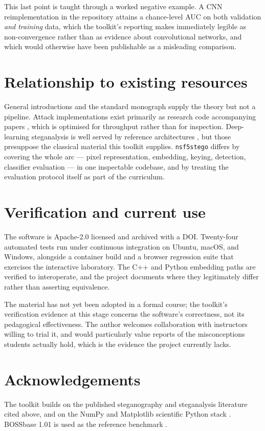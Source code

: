 \documentclass[11pt,a4paper]{article}
\begin{document}
This last point is taught through a worked negative example. A CNN
reimplementation in the repository attains a chance-level AUC on both validation
\emph{and training} data, which the toolkit's reporting makes immediately legible
as non-convergence rather than as evidence about convolutional networks, and
which would otherwise have been publishable as a misleading comparison.

\section*{Relationship to existing resources}

General introductions \citep{provos2003hide} and the standard monograph
\citep{fridrich2009book} supply the theory but not a pipeline. Attack
implementations exist primarily as research code accompanying papers
\citep{pevny2010spam,fridrich2012rich}, which is optimised for throughput rather
than for inspection. Deep-learning steganalysis is well served by reference
architectures \citep{xu2016xunet,ye2017yenet}, but those presuppose the classical
material this toolkit supplies. \texttt{nsf5stego} differs by covering the whole
arc --- pixel representation, embedding, keying, detection, classifier evaluation
--- in one inspectable codebase, and by treating the evaluation protocol itself as
part of the curriculum.

\section*{Verification and current use}

The software is Apache-2.0 licensed and archived with a DOI. Twenty-four automated
tests run under continuous integration on Ubuntu, macOS, and Windows, alongside a
container build and a browser regression suite that exercises the interactive
laboratory. The C++ and Python embedding paths are verified to interoperate, and
the project documents where they legitimately differ rather than asserting
equivalence.

The material has not yet been adopted in a formal course; the toolkit's
verification evidence at this stage concerns the software's correctness, not its
pedagogical effectiveness. The author welcomes collaboration with instructors
willing to trial it, and would particularly value reports of the misconceptions
students actually hold, which is the evidence the project currently lacks.

\section*{Acknowledgements}

The toolkit builds on the published steganography and steganalysis literature
cited above, and on the NumPy and Matplotlib scientific Python stack
\citep{harris2020numpy}. BOSSbase 1.01 is used as the reference benchmark
\citep{bas2011boss}.



\end{document}
